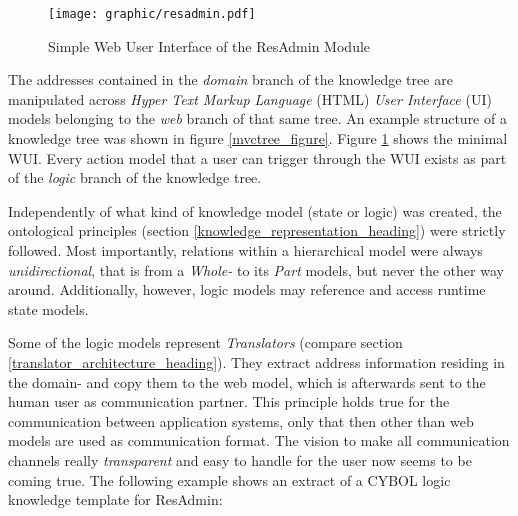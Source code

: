 \begin{figure}[ht]
    \begin{center}
        \texttt{[image: graphic/resadmin.pdf]}
        \caption{Simple Web User Interface of the ResAdmin Module \cite{holzmueller2005}}
        \label{resadmin_figure}
    \end{center}
\end{figure}

The addresses contained in the \emph{domain} branch of the knowledge tree are
manipulated across \emph{Hyper Text Markup Language} (HTML) \emph{User Interface}
(UI) models belonging to the \emph{web} branch of that same tree. An example
structure of a knowledge tree was shown in figure \ref{mvctree_figure}. Figure
\ref{resadmin_figure} shows the minimal WUI. Every action model that a user can
trigger through the WUI exists as part of the \emph{logic} branch of the
knowledge tree.

Independently of what kind of knowledge model (state or logic) was created, the
ontological principles (section \ref{knowledge_representation_heading}) were
strictly followed. Most importantly, relations within a hierarchical model were
always \emph{unidirectional}, that is from a \emph{Whole-} to its \emph{Part}
models, but never the other way around. Additionally, however, logic models may
reference and access runtime state models.

Some of the logic models represent \emph{Translators} (compare section
\ref{translator_architecture_heading}). They extract address information
residing in the domain- and copy them to the web model, which is afterwards
sent to the human user as communication partner. This principle holds true for
the communication between application systems, only that then other than web
models are used as communication format. The vision to make all communication
channels really \emph{transparent} and easy to handle for the user now seems to
be coming true. The following example shows an extract of a CYBOL logic
knowledge template for ResAdmin:

